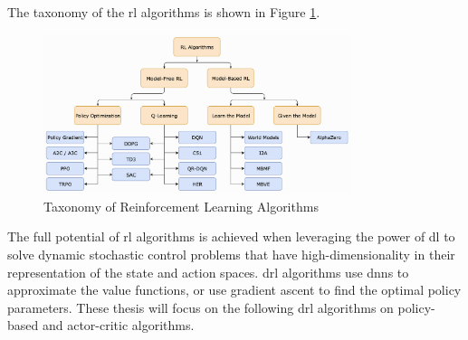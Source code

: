 The taxonomy of the \acrshort{rl} algorithms is shown in Figure \ref{fig:rl_taxonomy}.
\begin{figure}
    \centering
    \includegraphics[width=0.8\textwidth]{figures/rl-taxonomy.png}
    \caption{Taxonomy of Reinforcement Learning Algorithms \cite{Achiam2018}}
    \label{fig:rl_taxonomy}
\end{figure}

The full potential of \acrlong{rl} algorithms is achieved when leveraging the power of \acrlong{dl} to solve dynamic stochastic control problems that have high-dimensionality in their representation of the state and action spaces. \acrshort{drl} algorithms use \acrshort{dnn}s to approximate the value functions, or use gradient ascent to find the optimal policy parameters. These thesis will focus on the following \acrshort{drl} algorithms on policy-based and actor-critic algorithms.
